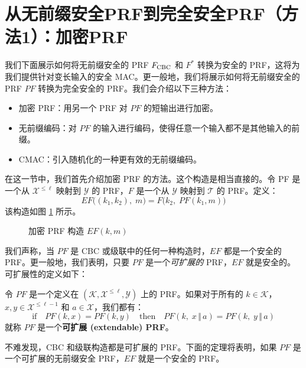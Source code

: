 \section{从无前缀安全PRF到完全安全PRF（方法1）：加密PRF}\label{sec:6-5}

我们下面展示如何将无前缀安全的 PRF $F_{\rm CBC}$ 和 $F^*$ 转换为安全的 PRF，这将为我们提供针对变长输入的安全 MAC。更一般地，我们将展示如何将无前缀安全的 PRF $PF$ 转换为完全安全的 PRF。我们会介绍以下三种方法：
\begin{itemize}
	\item 加密 PRF：用另一个 PRF 对 $PF$ 的短输出进行加密。
	\item 无前缀编码：对 $PF$ 的输入进行编码，使得任意一个输入都不是其他输入的前缀。
	\item CMAC：引入随机化的一种更有效的无前缀编码。
\end{itemize}
在这一节中，我们首先介绍加密 PRF 的方法。这个构造是相当直接的。令 PF 是一个从 $\mathcal{X}^{\leq\ell}$ 映射到 $\mathcal{Y}$ 的 PRF，$F$ 是一个从 $\mathcal{Y}$ 映射到 $\mathcal{T}$ 的 PRF。定义：
\begin{equation}\label{eq:6-17}
EF\big((k_1,k_2),\;m\big)=F\big(k_2,\;PF(k_1,m)\big)
\end{equation}
该构造如图 \ref{fig:6-4} 所示。

\begin{figure}
  \centering
  
  \caption{加密 PRF 构造 $EF(k,m)$}
  \label{fig:6-4}
\end{figure}

我们声称，当 $PF$ 是 CBC 或级联中的任何一种构造时，$EF$ 都是一个安全的 PRF。更一般地，我们表明，只要 $PF$ 是一个\emph{可扩展的} PRF，$EF$ 就是安全的。可扩展性的定义如下：

\begin{definition}\label{def:6-4}
令 $PF$ 是一个定义在 $(\mathcal{K},\mathcal{X}^{\leq\ell},\mathcal{Y})$ 上的 PRF。如果对于所有的 $k\in\mathcal{K}$，$x,y\in\mathcal{X}^{\leq\ell-1}$ 和 $a\in\mathcal{X}$，我们都有：
\[
\text{if}\quad
PF(k,x)=PF(k,y)
\quad\text{then}\quad
PF(k,\;x\,\Vert\,a)=PF(k,\;y\,\Vert\,a)
\]
就称 $PF$ 是一个\textbf{可扩展 (extendable) PRF}。
\end{definition}

不难发现，CBC 和级联构造都是可扩展的 PRF。下面的定理将表明，如果 $PF$ 是一个可扩展的无前缀安全 PRF，$EF$ 就是一个安全的 PRF。

